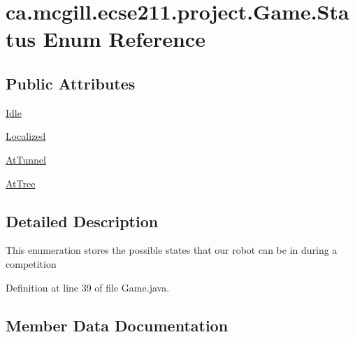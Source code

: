 \hypertarget{enumca_1_1mcgill_1_1ecse211_1_1project_1_1_game_1_1_status}{}\section{ca.\+mcgill.\+ecse211.\+project.\+Game.\+Status Enum Reference}
\label{enumca_1_1mcgill_1_1ecse211_1_1project_1_1_game_1_1_status}
\subsection*{Public Attributes}
\begin{DoxyCompactItemize}
\item 
\hyperlink{enumca_1_1mcgill_1_1ecse211_1_1project_1_1_game_1_1_status_a4ee6ac6711e6f0f96cfbe832f260c89f}{Idle}
\item 
\hyperlink{enumca_1_1mcgill_1_1ecse211_1_1project_1_1_game_1_1_status_a7d3a789bd51e152bd2643e7214a178f8}{Localized}
\item 
\hyperlink{enumca_1_1mcgill_1_1ecse211_1_1project_1_1_game_1_1_status_a7ebcaa409a8a78b543975cca230f51a3}{At\+Tunnel}
\item 
\hyperlink{enumca_1_1mcgill_1_1ecse211_1_1project_1_1_game_1_1_status_ae3a62c62aab81b3a4ada7940139ff936}{At\+Tree}
\end{DoxyCompactItemize}


\subsection{Detailed Description}
This enumeration stores the possible states that our robot can be in during a competition 

Definition at line 39 of file Game.\+java.



\subsection{Member Data Documentation}
\mbox{\label{enumca_1_1mcgill_1_1ecse211_1_1project_1_1_game_1_1_status_ae3a62c62aab81b3a4ada7940139ff936}} 
